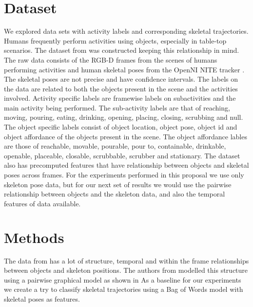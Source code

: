 \documentclass{article} %
\begin{document}
\section{Dataset}
We explored data sets with activity labels and corresponding skeletal trajectories. Humans frequently perform activities using objects, especially in table-top scenarios. The dataset from \cite{koppula2013detectingactivitiesrgbd} was constructed keeping this relationship in mind. The raw data consists of the RGB-D frames from the scenes of humans performing activities and human skeletal poses from the OpenNI NITE tracker \cite{PrimeSense2010}. The skeletal poses are not precise and have confidence intervals. The labels on the data are related to both the objects present in the scene and the activities involved. Activity specific labels are framewise labels on subactivities	and the main activity being performed. The sub-activity labels are that of reaching, moving, pouring, eating, drinking, opening, placing, closing, scrubbing and null. The object specific labels consist of object location, object pose, object id and object affordance of the objects present in the scene. The object affordance lables are those of reachable, movable, pourable, pour to, containable, drinkable, openable, placeable, closable, scrubbable, scrubber and stationary. The dataset also has precomputed features that have relationship between objects and skeletal poses across frames. 
For the experiments performed in this proposal we use only skeleton pose data, but for our next set of results we would use the pairwise relationship between objects and the skeleton data, and also the temporal features of data available.


\section{Methods}
The data from \cite{koppula2013detectingactivitiesrgbd} has a lot of structure, temporal and within the frame relationships between objects and skeleton positions. The authors from \cite{koppula2013detectingactivitiesrgbd} modelled this structure using a pairwise graphical model as shown in 
As a baseline for our experiments we create a try to classify skeletal trajectories using a Bag of Words model \cite{Sivic03} with skeletal poses as features.




\end{document}
